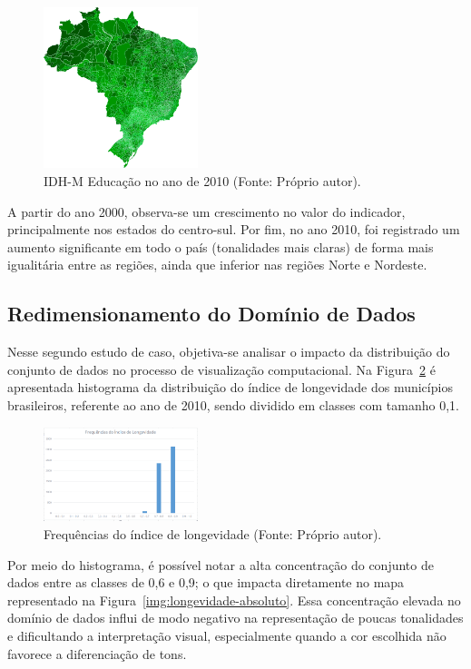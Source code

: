 \documentclass[conference]{IEEEtran}
\begin{document}
\begin{figure}[!ht]
\centering
\includegraphics[width=0.40\textwidth]{educacao-2010.png}
\caption{IDH-M Educação no ano de 2010 (Fonte: Próprio autor).}
\label{img:educacao-2010}
\end{figure}

A partir do ano 2000, observa-se um crescimento no valor do indicador, principalmente nos estados do centro-sul. Por fim, no ano 2010, foi registrado um aumento significante em todo o país (tonalidades mais claras) de forma mais igualitária entre as regiões, ainda que inferior nas regiões Norte e Nordeste.


\subsection{Redimensionamento do Domínio de Dados}
\label{section:redimensionamento}
Nesse segundo estudo de caso, objetiva-se analisar o impacto da distribuição do conjunto de dados no processo de visualização computacional. Na Figura~\ref{img:histograma} é apresentada histograma da distribuição do índice de longevidade dos municípios brasileiros, referente ao ano de 2010, sendo dividido em classes com tamanho 0,1.

\begin{figure}[!ht]
\centering
\includegraphics[width=0.40\textwidth]{frequencia.png}
\caption{Frequências do índice de longevidade (Fonte: Próprio autor).}
\label{img:histograma}
\end{figure}

Por meio do histograma, é possível notar a alta concentração do conjunto de dados entre as classes de 0,6 e 0,9; o que impacta diretamente no mapa representado na Figura~\ref{img:longevidade-absoluto}. Essa concentração elevada no domínio de dados influi de modo negativo na representação de poucas tonalidades e dificultando a interpretação visual, especialmente quando a cor escolhida não favorece a diferenciação de tons. 
\end{document}
